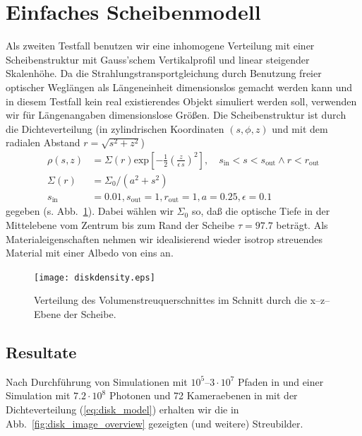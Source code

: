 	\section{Einfaches Scheibenmodell}
	Als zweiten Testfall benutzen wir eine inhomogene Verteilung mit einer Scheibenstruktur mit Gauss'schem Vertikalprofil und linear steigender Skalenhöhe. Da die Strahlungstransportgleichung durch Benutzung freier optischer Weglängen als Längeneinheit dimensionslos gemacht werden kann und in diesem Testfall kein real existierendes Objekt simuliert werden soll, verwenden wir für Längenangaben dimensionslose Größen. Die Scheibenstruktur ist durch die Dichteverteilung (in zylindrischen Koordinaten $(s,\phi,z)$ und mit dem radialen Abstand $r=\sqrt{s^2+z^2}$)
	\begin{align}
		\rho(s,z)&=\Sigma(r)\text{exp}\left[-\frac{1}{2}\left(\frac{z}{\epsilon\,s}\right)^2\right],\quad s_\text{in}<s<s_\text{out}\land r<r_\text{out} \nonumber\\
		\Sigma(r)&=\Sigma_0 / (a^2+s^2) \label{eq:disk_model} \\
		s_\text{in}&=0.01, s_\text{out}=1, r_\text{out}=1, a=0.25, \epsilon=0.1 \nonumber
	\end{align}
	gegeben (s. Abb.~\ref{fig:diskdensity}).	Dabei wählen wir $\Sigma_0$ so, daß die optische Tiefe in der Mittelebene vom Zentrum bis zum Rand der Scheibe $\tau=97.7$ beträgt. Als Materialeigenschaften nehmen wir idealisierend wieder isotrop streuendes Material mit einer Albedo von eins an.
	
		\begin{figure}
			\centering
			\texttt{[image: diskdensity.eps]}
			\caption{Verteilung des Volumenstreuquerschnittes im Schnitt durch die x--z--Ebene der Scheibe.}
			\label{fig:diskdensity}
		\end{figure}
	
	\subsection{Resultate}
		Nach Durchführung von Simulationen mit $10^5$--$3\cdot 10^7$ Pfaden in \pirate und einer Simulation mit $7.2\cdot 10^8$ Photonen und 72 Kameraebenen in \mctd mit der Dichteverteilung (\ref{eq:disk_model}) erhalten wir die in Abb.~\ref{fig:disk_image_overview} gezeigten (und weitere) Streubilder.
		
